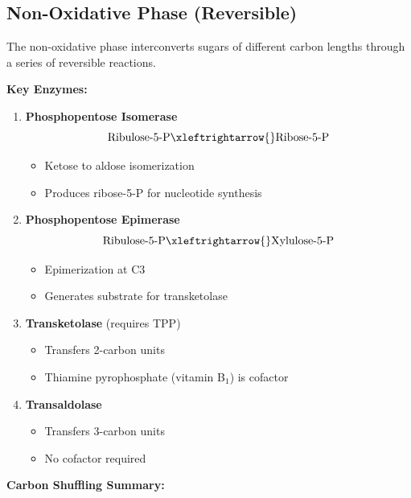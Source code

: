 \subsection{Non-Oxidative Phase (Reversible)}

The non-oxidative phase interconverts sugars of different carbon lengths through a series of reversible reactions.

\textbf{Key Enzymes:}

\begin{enumerate}
    \item \textbf{Phosphopentose Isomerase}
    \[
    \text{Ribulose-5-P} \xleftrightarrow{} \text{Ribose-5-P}
    \]
    \begin{itemize}
        \item Ketose to aldose isomerization
        \item Produces ribose-5-P for nucleotide synthesis
    \end{itemize}
    
    \item \textbf{Phosphopentose Epimerase}
    \[
    \text{Ribulose-5-P} \xleftrightarrow{} \text{Xylulose-5-P}
    \]
    \begin{itemize}
        \item Epimerization at C3
        \item Generates substrate for transketolase
    \end{itemize}
    
    \item \textbf{Transketolase} (requires TPP)
    \begin{itemize}
        \item Transfers 2-carbon units
        \item Thiamine pyrophosphate (vitamin B$_1$) is cofactor
    \end{itemize}
    
    \item \textbf{Transaldolase}
    \begin{itemize}
        \item Transfers 3-carbon units
        \item No cofactor required
    \end{itemize}
\end{enumerate}

\textbf{Carbon Shuffling Summary:}

